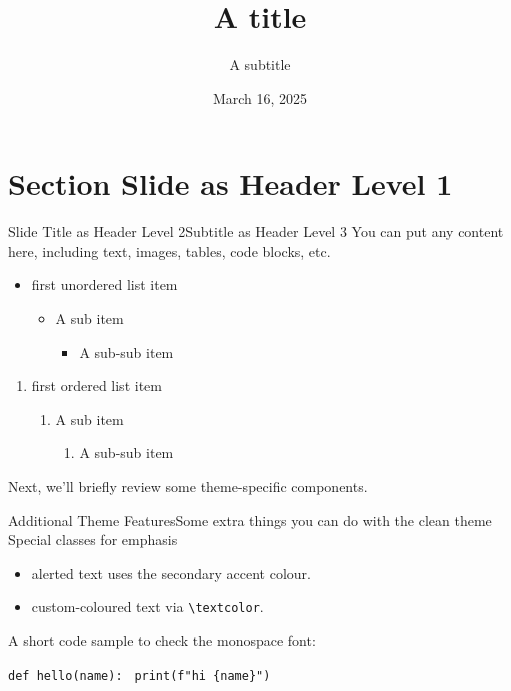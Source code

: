 \documentclass[aspectratio=169, 11pt]{beamer}
\title{A title}
\subtitle{A subtitle}
\date{March 16, 2025}
\begin{document}
\maketitle

\section{Section Slide as Header Level 1}

\begin{frame}{Slide Title as Header Level 2}{Subtitle as Header Level 3}
  You can put any content here, including text, images, tables, code blocks, etc.

  \begin{itemize}
    \item first unordered list item
    \begin{itemize}
      \item A sub item
      \begin{itemize}
        \item A sub-sub item
      \end{itemize}
    \end{itemize}
  \end{itemize}

  \begin{enumerate}
    \item first ordered list item
    \begin{enumerate}
      \item A sub item
      \begin{enumerate}
        \item A sub-sub item
      \end{enumerate}
    \end{enumerate}
  \end{enumerate}

  Next, we'll briefly review some theme-specific components.
\end{frame}

\begin{frame}{Additional Theme Features}{Some extra things you can do with the clean theme}
  Special classes for emphasis
  \begin{itemize}
    \item \alert{alerted text} uses the secondary accent colour.
    \item \textcolor{cleanPrimary}{custom-coloured text} via \texttt{\textbackslash textcolor}.
  \end{itemize}

  A short code sample to check the monospace font:
  \begin{semiverbatim}
  \texttt{def hello(name):}
  \texttt{    print(f"hi \{name\}")}
  \end{semiverbatim}
\end{frame}
\end{document}
